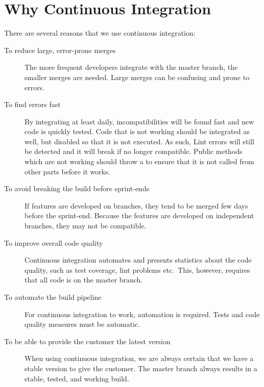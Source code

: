 \section{Why Continuous Integration}
There are several reasons that we use continuous integration:
\begin{description}
  \item[To reduce large, error-prone merges] The more frequent developers integrate with the master branch, the smaller merges are needed. Large merges can be confusing and prone to errors.
  \item[To find errors fast] By integrating at least daily, incompatibilities will be found fast and new code is quickly tested. Code that is not working should be integrated as well, but disabled so that it is not executed. As such, Lint errors will still be detected and it will break if no longer compatible. Public methods which are not working should throw a  to ensure that it is not called from other parts before it works.
  \item[To avoid breaking the build before sprint-ends] If features are developed on branches, they tend to be merged few days before the sprint-end. Because the features are developed on independent branches, they may not be compatible.
  \item[To improve overall code quality] Continuous integration automates and presents statistics about the code quality, such as test coverage, lint problems etc.\ This, however, requires that all code is on the master branch.
  \item[To automate the build pipeline] For continuous integration to work, automation is required. Tests and code quality measures must be automatic.
  \item[To be able to provide the customer the latest version] When using continuous integration, we are always certain that we have a stable version to give the customer. The master branch always results in a stable, tested, and working build.
\end{description}